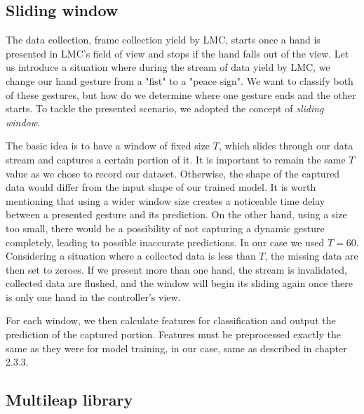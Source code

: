 \subsection{Sliding window}

The data collection, frame collection yield by LMC, starts once a hand is presented in LMC's field of view and stops if the hand falls out of the view. Let us introduce a situation where during the stream of data yield by LMC, we change our hand gesture from a "fist" to a "peace sign". We want to classify both of these gestures, but how do we determine where one gesture ends and the other starts. To tackle the presented scenario, we adopted the concept of \textit{sliding window}.

The basic idea is to have a window of fixed size $T$, which slides through our data stream and captures a certain portion of it. It is important to remain the same $T$ value as we chose to record our dataset. Otherwise, the shape of the captured data would differ from the input shape of our trained model. It is worth mentioning that using a wider window size creates a noticeable time delay between a presented gesture and its prediction. On the other hand, using a size too small, there would be a possibility of not capturing a dynamic gesture completely, leading to possible inaccurate predictions. In our case we used $T = 60$. Considering a situation where a collected data is less than $T$, the missing data are then set to zeroes. If we present more than one hand, the stream is invalidated, collected data are flushed, and the window will begin its sliding again once there is only one hand in the controller's view.

For each window, we then calculate features for classification and output the prediction of the captured portion. Features must be preprocessed exactly the same as they were for model training, in our case, same as described in chapter 2.3.3.

\subsection{Multileap library}

